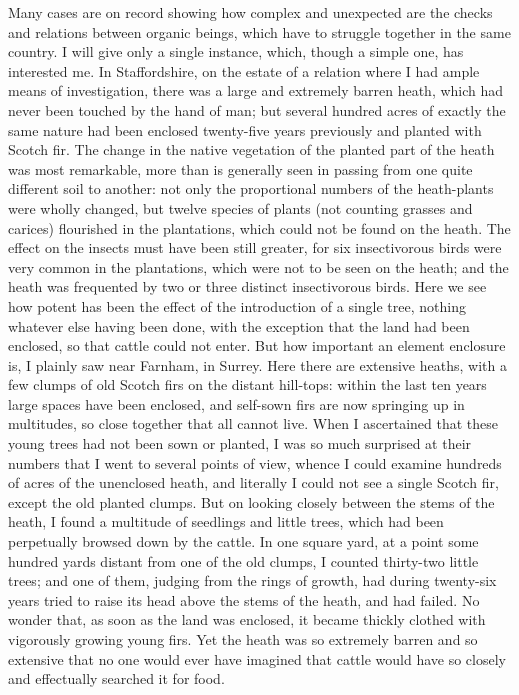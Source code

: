 Many cases are on record showing how complex and unexpected are the checks and relations between organic beings, which have to struggle together in the same country. I will give only a single instance, which, though a simple one, has interested me. In Staffordshire, on the estate of a relation where I had ample means of investigation, there was a large and extremely barren heath, which had never been touched by the hand of man; but several hundred acres of exactly the same nature had been enclosed twenty-five years previously and planted with Scotch fir. The change in the native vegetation of the planted part of the heath was most remarkable, more than is generally seen in passing from one quite different soil to another: not only the proportional numbers of the heath-plants were wholly changed, but twelve species of plants (not counting grasses and carices) flourished in the plantations, which could not be found on the heath. The effect on the insects must have been still greater, for six insectivorous birds were very common in the plantations, which were not to be seen on the heath; and the heath was frequented by two or three distinct insectivorous birds. Here we see how potent has been the effect of the introduction of a single tree, nothing whatever else having been done, with the exception that the land had been enclosed, so that cattle could not enter. But how important an element enclosure is, I plainly saw near Farnham, in Surrey. Here there are extensive heaths, with a few clumps of old Scotch firs on the distant hill-tops: within the last ten years large spaces have been enclosed, and self-sown firs are now springing up in multitudes, so close together that all cannot live.
When I ascertained that these young trees had not been sown or planted, I was so much surprised at their numbers that I went to several points of view, whence I could examine hundreds of acres of the unenclosed heath, and literally I could not see a single Scotch fir, except the old planted clumps. But on looking closely between the stems of the heath, I found a multitude of seedlings and little trees, which had been perpetually browsed down by the cattle. In one square yard, at a point some hundred yards distant from one of the old clumps, I counted thirty-two little trees; and one of them, judging from the rings of growth, had during twenty-six years tried to raise its head above the stems of the heath, and had failed. No wonder that, as soon as the land was enclosed, it became thickly clothed with vigorously growing young firs. Yet the heath was so extremely barren and so extensive that no one would ever have imagined that cattle would have so closely and effectually searched it for food.
